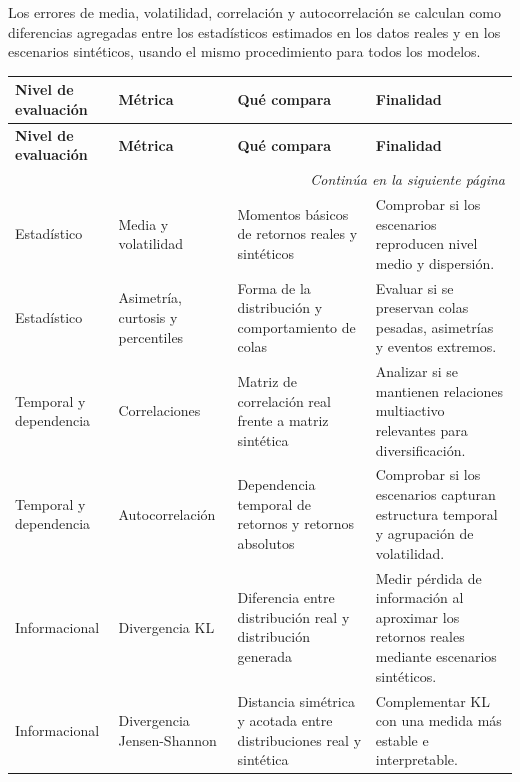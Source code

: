 \documentclass[11pt,a4paper,spanish,oneside]{book}
\numberwithin{equation}{chapter}
\numberwithin{figure}{chapter}
\begin{document}
Los errores de media, volatilidad, correlación y autocorrelación se calculan como diferencias agregadas entre los estadísticos estimados en los datos reales y en los escenarios sintéticos, usando el mismo procedimiento para todos los modelos.

{\footnotesize
\renewcommand{\arraystretch}{1.2}
\setlength{\tabcolsep}{4pt}

\begin{longtable}{|p{}|p{}|p{}|p{}|}

\hline
\textbf{Nivel de evaluación} & \textbf{Métrica} & \textbf{Qué compara} & \textbf{Finalidad} \\
\hline
\endfirsthead

\hline
\textbf{Nivel de evaluación} & \textbf{Métrica} & \textbf{Qué compara} & \textbf{Finalidad} \\
\hline
\endhead

\hline
\multicolumn{4}{r}{\textit{Continúa en la siguiente página}} \\
\endfoot

\endlastfoot

Estadístico & Media y volatilidad & Momentos básicos de retornos reales y sintéticos & Comprobar si los escenarios reproducen nivel medio y dispersión. \\
\hline

Estadístico & Asimetría, curtosis y percentiles & Forma de la distribución y comportamiento de colas & Evaluar si se preservan colas pesadas, asimetrías y eventos extremos. \\
\hline

Temporal y dependencia & Correlaciones & Matriz de correlación real frente a matriz sintética & Analizar si se mantienen relaciones multiactivo relevantes para diversificación. \\
\hline

Temporal y dependencia & Autocorrelación & Dependencia temporal de retornos y retornos absolutos & Comprobar si los escenarios capturan estructura temporal y agrupación de volatilidad. \\
\hline

Informacional & Divergencia KL & Diferencia entre distribución real y distribución generada & Medir pérdida de información al aproximar los retornos reales mediante escenarios sintéticos. \\
\hline

Informacional & Divergencia Jensen-Shannon & Distancia simétrica y acotada entre distribuciones real y sintética & Complementar KL con una medida más estable e interpretable. \\
\hline


\end{longtable}}
\end{document}
